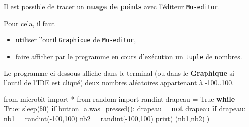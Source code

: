 \documentclass[a4paper,17pt]{extarticle}
\providecommand{\tightlist}{%
      \setlength{\itemsep}{0pt}\setlength{\parskip}{0pt}}
\newenvironment{Shaded}{}{}
\newcommand{\KeywordTok}[1]{\textcolor[rgb]{0.00,0.44,0.13}{\textbf{{#1}}}}
\newcommand{\DecValTok}[1]{\textcolor[rgb]{0.25,0.63,0.44}{{#1}}}
\newcommand{\NormalTok}[1]{{#1}}
\newcommand{\ImportTok}[1]{{#1}}
\newcommand{\VariableTok}[1]{\textcolor[rgb]{0.10,0.09,0.49}{{#1}}}
\newcommand{\ControlFlowTok}[1]{\textcolor[rgb]{0.00,0.44,0.13}{\textbf{{#1}}}}
\newcommand{\OperatorTok}[1]{\textcolor[rgb]{0.40,0.40,0.40}{{#1}}}
\newcommand{\BuiltInTok}[1]{{#1}}
\begin{document}
Il est possible de tracer un \textbf{nuage de points} avec l'éditeur
\texttt{Mu-editor}.

Pour cela, il faut

\begin{itemize}
\tightlist
\item
  utiliser l'outil \texttt{Graphique} de \texttt{Mu-editor},
\item
  faire afficher par le programme en cours d'exécution un \texttt{tuple}
  de nombres.
\end{itemize}
\begin{exemple}
    Le programme ci-dessous affiche dans le terminal (ou dans le
\textbf{Graphique} si l'outil de l'IDE est cliqué) deux nombres
aléatoires appartenant à -100..100.

\begin{Shaded}
\begin{Highlighting}[]
\ImportTok{from}\NormalTok{ microbit }\ImportTok{import} \OperatorTok{*}
\ImportTok{from}\NormalTok{ random }\ImportTok{import}\NormalTok{ randint}
\NormalTok{drapeau }\OperatorTok{=} \VariableTok{True}
\ControlFlowTok{while} \VariableTok{True}\NormalTok{:}
\NormalTok{    sleep(}\DecValTok{50}\NormalTok{)}
    \ControlFlowTok{if}\NormalTok{ button\_a.was\_pressed():}
\NormalTok{        drapeau }\OperatorTok{=} \KeywordTok{not}\NormalTok{ drapeau}
    \ControlFlowTok{if}\NormalTok{ drapeau:}
\NormalTok{        nb1 }\OperatorTok{=}\NormalTok{ randint(}\OperatorTok{{-}}\DecValTok{100}\NormalTok{,}\DecValTok{100}\NormalTok{)}
\NormalTok{        nb2 }\OperatorTok{=}\NormalTok{ randint(}\OperatorTok{{-}}\DecValTok{100}\NormalTok{,}\DecValTok{100}\NormalTok{)}
        \BuiltInTok{print}\NormalTok{( (nb1,nb2) )}
\end{Highlighting}
\end{Shaded}

        \end{exemple}

    
    
    
\end{document}

